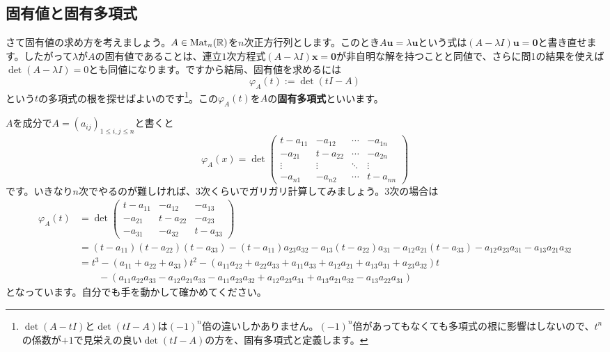 \subsection{固有値と固有多項式}

さて固有値の求め方を考えましょう。$A \in \operatorname{Mat}_n(\mathbb{R})$を$n$次正方行列とします。このとき$A\bm{u} = \lambda \bm{u}$という式は$(A - \lambda I) \bm{u} = \bm{0}$と書き直せます。したがって$\lambda$が$A$の固有値であることは、連立$1$次方程式$(A - \lambda I)\bm{x} = \bm{0}$が非自明な解を持つことと同値で、さらに問1の結果を使えば$\det (A - \lambda I) = 0$とも同値になります。ですから結局、固有値を求めるには
\[
\varphi_A(t) := \det(t I - A)
\]
という$t$の多項式の根を探せばよいのです\footnote{$\det(A - tI)$と$\det (tI - A)$は$(-1)^n$倍の違いしかありません。$(-1)^n$倍があってもなくても多項式の根に影響はしないので、$t^n$の係数が$+1$で見栄えの良い$\det(tI - A)$の方を、固有多項式と定義します。}。この$\varphi_A(t)$を$A$の\textbf{固有多項式}といいます。

$A$を成分で$A = (a_{ij})_{1 \leq i, j \leq n}$と書くと
\[
\varphi_A(x) =
\det
\begin{pmatrix}
t - a_{11} & - a_{12} & \cdots & -a_{1n} \\
-a_{21} & t - a_{22} & \cdots & -a_{2n} \\
\vdots & \vdots & \ddots & \vdots \\
-a_{n1} & -a_{n2} & \cdots & t - a_{nn}
\end{pmatrix}
\]
です。いきなり$n$次でやるのが難しければ、$3$次くらいでガリガリ計算してみましょう。$3$次の場合は
\begin{align*}
\varphi_A(t) &= \det
\begin{pmatrix}
t - a_{11} & -a_{12} & -a_{13} \\
-a_{21} & t - a_{22} & -a_{23} \\
-a_{31} & -a_{32} & t - a_{33}
\end{pmatrix} \\
&= (t - a_{11})(t - a_{22})(t - a_{33}) - (t - a_{11}) a_{23} a_{32} - a_{13} (t - a_{22}) a_{31} - a_{12} a_{21} (t - a_{33}) - a_{12} a_{23} a_{31} - a_{13} a_{21} a_{32} \\
&= t^3 - (a_{11} + a_{22} + a_{33})t^2 - (a_{11} a_{22} + a_{22} a_{33} + a_{11} a_{33} + a_{12} a_{21} + a_{13} a_{31} + a_{23} a_{32}) t \\
& \qquad - (a_{11} a_{22} a_{33} - a_{12} a_{21} a_{33} - a_{11} a_{23} a_{32} + a_{12} a_{23} a_{31} + a_{13} a_{21} a_{32} - a_{13} a_{22} a_{31})
\end{align*}
となっています。自分でも手を動かして確かめてください。

